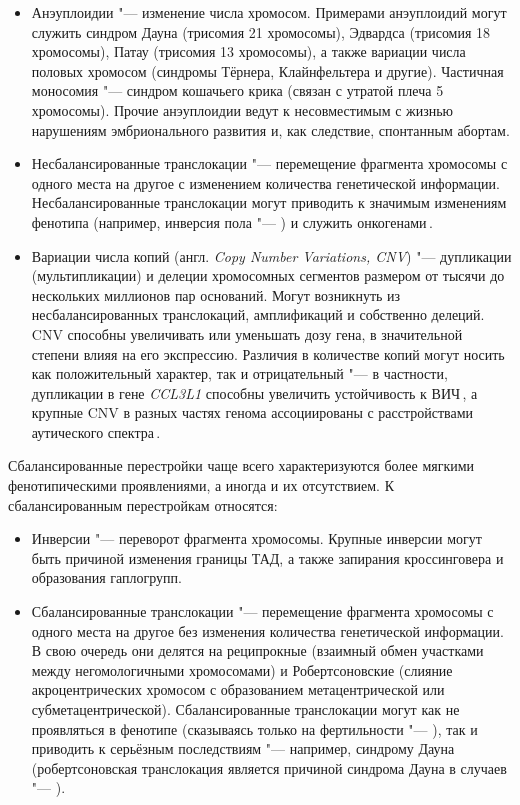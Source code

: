 \documentclass[a4paper,14pt]{extarticle}
\newcommand{\genename}[1]{\textit{#1}}
\newcommand{\engterm}[1]{англ. \textenglish{\textit{#1}}}
\begin{document}
\begin{itemize}
	\item Анэуплоидии "--- изменение числа хромосом.
	      Примерами анэуплоидий могут служить синдром Дауна (трисомия 21 хромосомы), Эдвардса (трисомия 18 хромосомы), Патау (трисомия 13 хромосомы), а также вариации числа половых хромосом (синдромы Тёрнера, Клайнфельтера и другие).
	      Частичная моносомия "--- синдром кошачьего крика (связан с утратой плеча 5 хромосомы).
	      Прочие анэуплоидии ведут к несовместимым с жизнью нарушениям эмбрионального развития и, как следствие, спонтанным абортам.
	\item Несбалансированные транслокации "--- перемещение фрагмента хромосомы с одного места на другое с изменением количества генетической информации.
	      Несбалансированные транслокации могут приводить к значимым изменениям фенотипа (например, инверсия пола "--- \citealp{Rizvi_2008}) и служить онкогенами\,\citep{O_Connor_2008}.
	\item Вариации числа копий (\engterm{Copy Number Variations, CNV}) "--- дупликации (мультипликации) и делеции хромосомных сегментов размером от тысячи до нескольких миллионов пар оснований.
	      Могут возникнуть из несбалансированных транслокаций, амплификаций и собственно делеций.
	      CNV способны увеличивать или уменьшать дозу гена, в значительной степени влияя на его экспрессию.
	      Различия в количестве копий могут носить как положительный характер, так и отрицательный "--- в частности, дупликации в гене \genename{CCL3L1} способны увеличить устойчивость к ВИЧ\,\citep{Gonzalez_2005}, а крупные CNV в разных частях генома ассоциированы с расстройствами аутического спектра\,\citep{Sebat_2007}.
\end{itemize}

Сбалансированные перестройки чаще всего характеризуются более мягкими фенотипическими проявлениями, а иногда и их отсутствием.
К сбалансированным перестройкам относятся:

\begin{itemize}
	\item Инверсии "--- переворот фрагмента хромосомы.
	      Крупные инверсии могут быть причиной изменения границы ТАД, а также запирания кроссинговера и образования гаплогрупп.
	\item Сбалансированные транслокации "--- перемещение фрагмента хромосомы с одного места на другое без изменения количества генетической информации.
	      В свою очередь они делятся на реципрокные (взаимный обмен участками между негомологичными хромосомами) и Робертсоновские (слияние акроцентрических хромосом с образованием метацентрической или субметацентрической).
	      Сбалансированные транслокации могут как не проявляться в фенотипе (сказываясь только на фертильности "--- \citealp{Dong_2012}), так и приводить к серьёзным последствиям "--- например, синдрому Дауна (робертсоновская транслокация является причиной синдрома Дауна в  случаев "--- \citealp{Asim_2015}).
\end{itemize}
\end{document}
